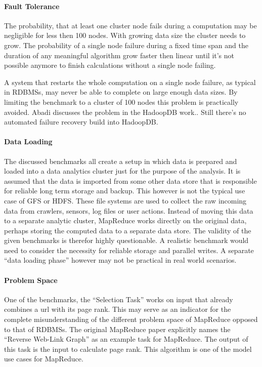 \documentclass[12pt,a4paper]{scrartcl}		%
\begin{document}
\paragraph{Fault Tolerance}
The probability, that at least one cluster node fails during a computation may be negligible for less then 100 nodes. With growing data size the cluster needs to grow. The probability of a single node failure during a fixed time span and the duration of any meaningful algorithm grow faster then linear until it's not possible anymore to finish calculations without a single node failing.

A system that restarts the whole computation on a single node failure, as typical in RDBMSs, may never be able to complete on large enough data sizes.
By limiting the benchmark to a cluster of 100 nodes this problem is practically avoided. Abadi discusses the problem in the HadoopDB work.\cite{journals/pvldb/AbouzeidBARS09}. Still there's no automated failure recovery build into HadoopDB.

\paragraph{Data Loading}
The discussed benchmarks all create a setup in which data is prepared and loaded into a data analytics cluster just for the purpose of the analysis. It is assumed that the data is imported from some other data store that is responsible for reliable long term storage and backup.
This however is not the typical use case of GFS or HDFS. These file systems are used to collect the raw incoming data from crawlers, sensors, log files or user actions. Instead of moving this data to a separate analytic cluster, MapReduce works directly on the original data, perhaps storing the computed data to a separate data store.
The validity of the given benchmarks is therefor highly questionable. A realistic benchmark would need to consider the necessity for reliable storage and parallel writes. A separate ``data loading phase'' however may not be practical in real world scenarios.

\paragraph{Problem Space}
One of the benchmarks, the ``Selection Task'' works on input that already combines a url with its page rank. This may serve as an indicator for the complete misunderstanding of the different problem space of MapReduce opposed to that of RDBMSs. The original MapReduce paper explicitly names the ``Reverse Web-Link Graph'' as an example task for MapReduce. The output of this task is the input to calculate page rank. This algorithm is one of the model use cases for MapReduce.
\end{document}
